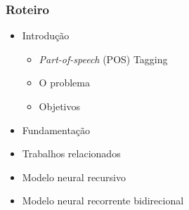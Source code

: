 \documentclass[10pt]{beamer}
\begin{document}
\begin{frame}
  \frametitle{Roteiro}


  \begin{itemize}


    \item Introdução
    \begin{itemize}
      \item[\ ] \textit{Part-of-speech} (POS) Tagging 
      \item[\ ] O problema
      \item[\ ] Objetivos
    \end{itemize}


    \color{gray}
    \item[\color{gray}{$\bullet$}] Fundamentação


    \item[\color{gray}{$\bullet$}] Trabalhos relacionados

    \item[\color{gray}{$\bullet$}] Modelo neural recursivo

    \item[\color{gray}{$\bullet$}] Modelo neural recorrente bidirecional


\end{itemize}
\end{frame}
\end{document}
